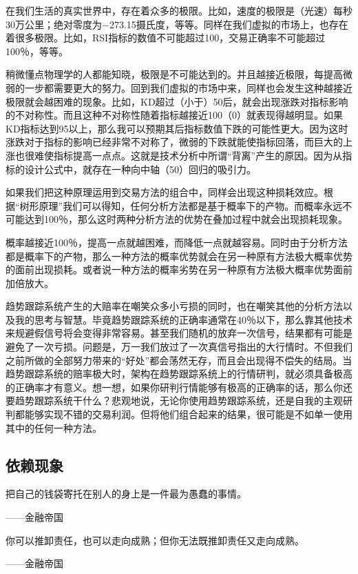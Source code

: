 在我们生活的真实世界中，存在着众多的极限。比如，速度的极限是（光速）每秒30万公里；绝对零度为$-$273.15摄氏度，等等。同样在我们虚拟的市场上，也存在着很多极限。比如，RSI指标的数值不可能超过100，交易正确率不可能超过100％，等等。

稍微懂点物理学的人都能知晓，极限是不可能达到的。并且越接近极限，每提高微弱的一步都需要更大的努力。回到我们虚拟的市场中来，同样也会发生这种越接近极限就会越困难的现象。比如，KD超过（小于）50后，就会出现涨跌对指标影响的不对称性。而且这种不对称性随着指标越接近100（0）就表现得越明显。如果KD指标达到95以上，那么我可以预期其后指标数值下跌的可能性更大。因为这时涨跌对于指标的影响已经非常不对称了，微弱的下跌就能使指标回落，而巨大的上涨也很难使指标提高一点点。这就是技术分析中所谓“背离”产生的原因。因为从指标的设计公式中，就存在一种向中轴（50）回归的吸引力。

如果我们把这种原理运用到交易方法的组合中，同样会出现这种损耗效应。根据“树形原理”我们可以得知，任何分析方法都是基于概率下的产物。而概率永远不可能达到100％，那么这时两种分析方法的优势在叠加过程中就会出现损耗现象。

概率越接近100％，提高一点就越困难，而降低一点就越容易。同时由于分析方法都是概率下的产物，那么一种方法的概率优势就会在另一种原有方法极大概率优势的面前出现损耗。或者说一种方法的概率劣势在另一种原有方法极大概率优势面前加倍放大。

趋势跟踪系统产生的大赔率在嘲笑众多小亏损的同时，也在嘲笑其他的分析方法以及我的思考与智慧。毕竟趋势跟踪系统的正确率通常在40％以下，那么靠其他技术来规避假信号将会变得非常容易。甚至我们随机的放弃一次信号，结果都有可能是避免了一次亏损。问题是，万一我们放过了一次真信号指出的大行情时。不但我们之前所做的全部努力带来的“好处”都会荡然无存，而且会出现得不偿失的结局。当趋势跟踪系统的赔率极大时，架构在趋势跟踪系统上的行情研判，就必须具备极高的正确率才有意义。想一想，如果你研判行情能够有极高的正确率的话，那么你还要趋势跟踪系统干什么？悲观地说，无论你使用趋势跟踪系统，还是自我的主观研判都能够实现不错的交易利润。但将他们组合起来的结果，很可能是不如单一使用其中的任何一种方法。

\subsection{依赖现象}

{\kaishu
把自己的钱袋寄托在别人的身上是一件最为愚蠢的事情。

\hfill ——金融帝国

你可以推卸责任，也可以走向成熟；但你无法既推卸责任又走向成熟。

\hfill ——金融帝国
}

